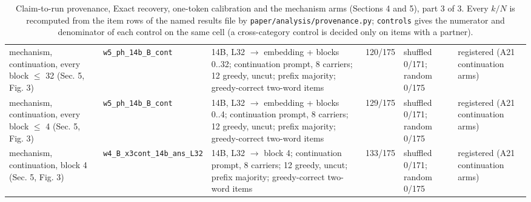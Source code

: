 \begin{table}[t]
\begin{tabular}{@{}p{2.5cm}p{2.3cm}p{4.5cm}p{1.3cm}p{3.0cm}p{2.9cm}@{}}
mechanism, continuation, every block $\le$ 32 (Sec. 5, Fig. 3) & \texttt{w5\_\allowbreak{{}}ph\_\allowbreak{{}}14b\_\allowbreak{{}}B\_\allowbreak{{}}cont} & 14B, L32 $\to$ embedding + blocks 0..32; continuation prompt, 8 carriers; 12 greedy, uncut; prefix majority; greedy-correct two-word items & 120/175 & shuffled 0/171; random 0/175 & registered (A21 continuation arms) \\
mechanism, continuation, every block $\le$ 4 (Sec. 5, Fig. 3) & \texttt{w5\_\allowbreak{{}}ph\_\allowbreak{{}}14b\_\allowbreak{{}}B\_\allowbreak{{}}cont} & 14B, L32 $\to$ embedding + blocks 0..4; continuation prompt, 8 carriers; 12 greedy, uncut; prefix majority; greedy-correct two-word items & 129/175 & shuffled 0/171; random 0/175 & registered (A21 continuation arms) \\
mechanism, continuation, block 4 (Sec. 5, Fig. 3) & \texttt{w4\_\allowbreak{{}}B\_\allowbreak{{}}x3cont\_\allowbreak{{}}14b\_\allowbreak{{}}ans\_\allowbreak{{}}L32} & 14B, L32 $\to$ block 4; continuation prompt, 8 carriers; 12 greedy, uncut; prefix majority; greedy-correct two-word items & 133/175 & shuffled 0/171; random 0/175 & registered (A21 continuation arms) \\
\bottomrule
\end{tabular}
\caption{Claim-to-run provenance, Exact recovery, one-token calibration and the mechanism arms (Sections 4 and 5), part 3 of 3. Every $k/N$ is recomputed from the item rows of the named results file by \texttt{paper/analysis/provenance.py}; \texttt{controls} gives the numerator and denominator of each control on the same cell (a cross-category control is decided only on items with a partner).}
\end{table}

